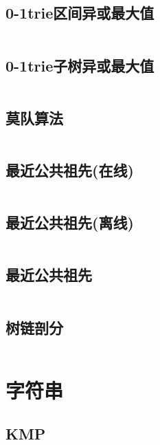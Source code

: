 \inputminted{cpp}{code/dsu_on_tree.cc}

\subsection{0-1trie区间异或最大值} 

\inputminted{cpp}{code/interval_xor_max.cc}

\subsection{0-1trie子树异或最大值} 

\inputminted{cpp}{code/tree_xor_max.cc}

\subsection{莫队算法} 

\inputminted{cpp}{code/mo.cc}

\subsection{最近公共祖先(在线)} 

\inputminted{cpp}{code/LCAonline.cc}

\subsection{最近公共祖先(离线)} 

\inputminted{cpp}{code/LCAoffline.cc}

\subsection{最近公共祖先} 

\inputminted{cpp}{code/LCAwanggann.cc}

\subsection{树链剖分} 

\inputminted{cpp}{code/heavy_light_decomposition.cpp}

\newpage\section{字符串} 
\subsection{KMP} 

